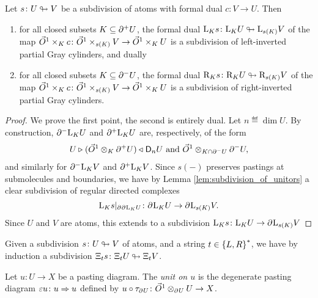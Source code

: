 \begin{lem} \label{lem:subdivision_of_invertors}
    Let \( s \colon U \looparrowright V \) be a subdivision of atoms with formal dual \( c \colon V \to U \).
    Then
    \begin{enumerate}
        \item for all closed subsets \( K \subseteq \partial_{}^{+} U \), the formal dual \( \mathrm{L}_{K} s \colon \mathrm{L}_{K} U \looparrowright \mathrm{L}_{s(K)} V \) of the map \( \vec{O}^{1} \times_K c \colon \vec{O}^{1} \times_{s(K)} V \to \vec{O}^{1} \times_K U \) is a subdivision of left-inverted partial Gray cylinders, and dually
        \item for all closed subsets \( K \subseteq \partial_{}^{-} U \), the formal dual \( \mathrm{R}_{K} s \colon \mathrm{R}_{K} U \looparrowright \mathrm{R}_{s(K)} V \) of the map \( \vec{O}^{1} \times_K c \colon \vec{O}^{1} \times_{s(K)} V \to \vec{O}^{1} \times_K U \)  is a subdivision of right-inverted partial Gray cylinders.
    \end{enumerate}
\end{lem}
\begin{proof}
    We prove the first point, the second is entirely dual.
    Let \( n \eqdef \dim U \).
    By construction, \( \partial_{}^{-} \mathrm{L}_{K} U \) and \( \partial_{}^{+} \mathrm{L}_{K} U \) are, respectively, of the form
    \begin{equation*}
        U \triangleright_{} (\vec{O}^{1} \otimes_K \partial_{}^{+} U) \prescript{}{\!}{\triangleleft}\; \mathsf{D}_{n}{U} \text{ and } \vec{O}^{1} \otimes_{K \cap \partial_{}^{-} U} \partial_{}^{-} U,
    \end{equation*}
    and similarly for \( \partial_{}^{-} \mathrm{L}_{K} V \) and \( \partial_{}^{+} \mathrm{L}_{K} V \).
    Since \( s(-) \) preserves pastings at submolecules and boundaries, we have by Lemma \ref{lem:subdivision_of_unitors} a clear subdivision of regular directed complexes 
    \begin{equation*}
        \restr{\lcyl{K} s}{\bd{}{} \bd{}{} \lcyl{K} U} \colon \bd{}{} \lcyl{K} U \to \bd{}{} \lcyl{s(K)} V.
    \end{equation*}
    Since \( U \) and \( V \) are atoms, this extends to a subdivision \( \mathrm{L}_{K} s \colon \mathrm{L}_{K} U \to \partial_{}^{} \mathrm{L}_{s(K)} V \)
\end{proof}

\begin{rmk}
    Given a subdivision \( s \colon U \looparrowright V \) of atoms, and a string \( t \in \left\{ {L, R} \right\}^* \), we have by induction a subdivision \( \Xi_{t} s \colon \Xi_{t} U \looparrowright \Xi_{t} V \).
\end{rmk}

\begin{dfn} [Unit]
    Let \( u \colon U \to X \) be a pasting diagram.
    The \emph{unit on \( u \)} is the degenerate pasting diagram \( \varepsilon u \colon u \Rightarrow u \) defined by \( u \circ \tau_{\partial_{}^{} U} \colon \vec{O}^{1} \otimes_{\partial_{}^{}U} U \to X \).
\end{dfn}

